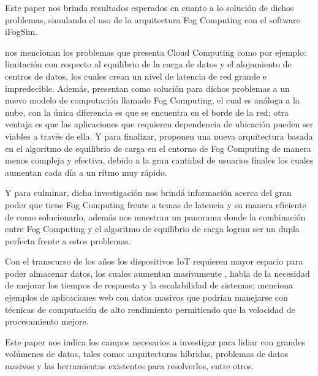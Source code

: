         Este paper nos brinda resultados esperados en cuanto a lo solución de dichos problemas, simulando el uso de la arquitectura Fog Computing con el software iFogSim.\par
        \vskip 0.3cm
        {\bf\cite{verma2015}} nos mencionan los problemas que presenta Cloud Computing como por ejemplo: limitación con respecto al equilibrio de la carga de datos y el alojamiento de centros de datos, los cuales crean un nivel de latencia de red grande e impredecible. Además, presentan como solución para dichos problemas a un nuevo modelo de computación llamado Fog Computing, el cual es análoga a la nube, con la única diferencia es que se encuentra en el borde de la red; otra ventaja es que las aplicaciones que requieren dependencia de ubicación pueden ser viables a través de ella. Y para finalizar, proponen una nueva arquitectura basada en el algoritmo de equilibrio de carga en el entorno de Fog Computing de manera menos compleja y efectiva, debido a la gran cantidad de usuarios finales los cuales aumentan cada día a un ritmo muy rápido. \par
        Y para culminar, dicha investigación nos brindá información acerca del gran poder que tiene Fog Computing frente a temas de latencia y su manera eficiente de como solucionarlo, además nos muestran un panorama donde la combinación entre Fog Computing y el algoritmo de equilibrio de carga logran ser un dupla perfecta frente a estos problemas.\par
        \vskip 0.3cm
        Con el transcurso de los años los dispositivos IoT requieren mayor espacio para poder almacenar datos, los cuales aumentan masivamente {\bf\citep{murazzo2017}}, habla de la necesidad de mejorar los tiempos de respuesta y la escalabilidad de sistemas; menciona ejemplos de aplicaciones web con datos masivos que podrían manejarse con técnicas de computación de alto rendimiento permitiendo que la velocidad de procesamiento mejore.\par
        Este paper nos indica los campos necesarios a investigar para lidiar con grandes volúmenes de datos, tales como: arquitecturas híbridas, problemas de datos masivos y las herramientas existentes para resolverlos, entre otros.\par
        \vskip 0.3cm
